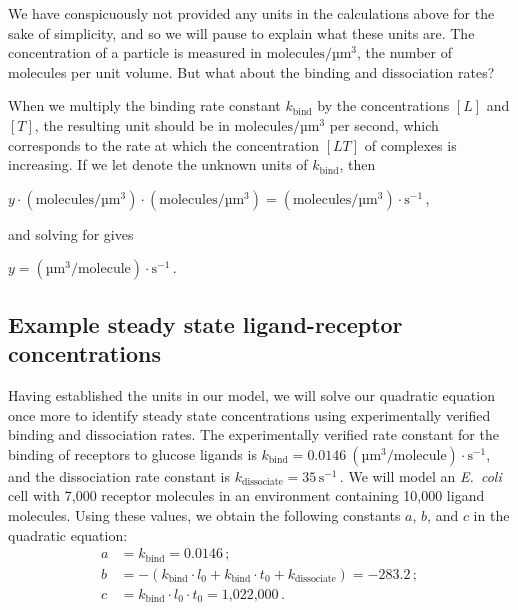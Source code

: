 We have conspicuously not provided any units in the calculations above for the sake of simplicity, and so we will pause to explain what these units are. The concentration of a particle is measured in $\text{molecules}/\text{µm}^3$, the number of molecules per unit volume. But what about the binding and dissociation rates?

When we multiply the binding rate constant $k_\text{bind}$ by the concentrations $[L]$ and $[T]$, the resulting unit should be in $\text{molecules}/\text{µm}^3$ per second, which corresponds to the rate at which the concentration $[LT]$ of complexes is increasing. If we let  denote the unknown units of $k_\text{bind}$, then

\begin{center}
$y \cdot (\text{molecules}/\text{µm}^3) \cdot (\text{molecules}/\text{µm}^3) = (\text{molecules}/\text{µm}^3) \cdot \text{s}^{-1}$\,,
\end{center}

\noindent and solving for  gives

\begin{center}
$y = (\text{µm}^3/\text{molecule}) \cdot \text{s}^{-1}$\,.
\end{center}

\fudgespace

\begin{qbox}\end{qbox}

\FloatBarrier
{}
\subsection{Example steady state ligand-receptor concentrations}

Having established the units in our model, we will solve our quadratic equation once more to identify steady state concentrations using experimentally verified binding and dissociation rates. The experimentally verified rate constant for the binding of receptors to glucose ligands is $k_\text{bind} = 0.0146~(\text{µm}^3/\text{molecule}) \cdot \text{s}^{-1}$, and the dissociation rate constant is $k_\text{dissociate} = 35\,\text{s}^{-1}$\,. We will model an \textit{E.~coli} cell with 7,000 receptor molecules in an environment containing 10,000 ligand molecules. Using these values, we obtain the following constants $a$, $b$, and $c$ in the quadratic equation:
\begin{align*}
a & = k_\text{bind} = 0.0146\,;\\
b & = - (k_\text{bind} \cdot l_0 + k_\text{bind} \cdot t_0 + k_\text{dissociate}) = -283.2\,;\\
c & = k_\text{bind} \cdot l_0 \cdot t_0 = \text{1,022,000}\,.
\end{align*}


